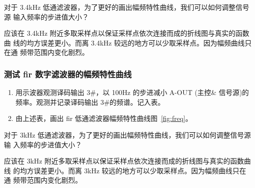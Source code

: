 \documentclass[../main]{subfiles}
\begin{document}
\begin{Exercise}[title = 思考]
  对于 3.4kHz 低通滤波器，为了更好的画出幅频特性曲线，我们可以如何调整信号源
  输入频率的步进值大小？
\end{Exercise}

\begin{Answer}
  应该在 3.4kHz 附近多取采样点以保证采样点依次连接而成的折线图与真实的函数曲
  线的均方误差更小。而离 3.4kHz 较远的地方可以少取采样点。因为幅频曲线只在通
  频带范围内变化剧烈。
\end{Answer}

\subsubsection{测试 fir 数字滤波器的幅频特性曲线}%
\label{ssub:fir}



  \begin{enumerate}
    \item 用示波器观测译码输出 3\#，以 100Hz 的步进减小
      A-OUT (主控\& 信号源)的频率。观测并记录译码输出 3\#的频谱。记入表。
    \item 由上述表，画出 fir 低通滤波器幅频特性曲线图~\ref{fig:freq}。
  \end{enumerate}

\begin{Exercise}[title = 思考]
  对于 3kHz 低通滤波器，为了更好的画出幅频特性曲线，我们可以如何调整信号源输
  入频率的步进值大小？
\end{Exercise}

\begin{Answer}
  应该在 3kHz 附近多取采样点以保证采样点依次连接而成的折线图与真实的函数曲线
  的均方误差更小。而离 3kHz 较远的地方可以少取采样点。因为幅频曲线只在通
  频带范围内变化剧烈。
\end{Answer}
\end{document}
